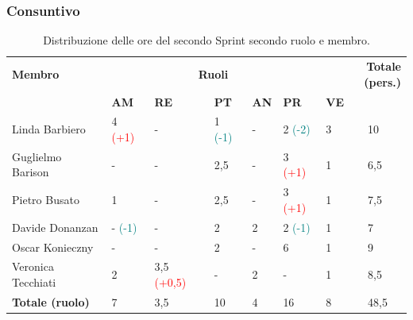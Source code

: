 \subsubsection{Consuntivo}
\begin{table}[ht!]
	\centering
	\begin{tabular}{p{3cm} p{1.4cm} p{1.6cm} p{1.5cm} p{1.5cm} p{1.5cm} p{1.5cm} p{1cm}}
		\toprule
        \textbf{Membro} & \multicolumn{5}{c}{\textbf{Ruoli}} & \multicolumn{2}{r}{\textbf{Totale (pers.)}}\\
		& \textbf{AM} & \textbf{RE} & \textbf{PT} & \textbf{AN} & \textbf{PR} & \textbf{VE}\\
		\midrule
        Linda Barbiero          & 4 \textcolor{red}{(+1)} & - & 1 \textcolor{teal}{(-1)}  & - & 2
        \textcolor{teal}{(-2)} & 3 & 10 \\
        Guglielmo Barison       & - & - & 2,5 & -     & 3 \textcolor{red}{(+1)}  & 1     & 6,5\\
        Pietro Busato           & 1     & -     & 2,5     & -     & 3 \textcolor{red}{(+1)}  & 1     & 7,5 \\
        Davide Donanzan         & - \textcolor{teal}{(-1)}    & -     & 2     & 2     & 2
        \textcolor{teal}{(-1)}     & 1     & 7 \\
        Oscar Konieczny         & -   & -     & 2     & -     & 6     & 1     & 9 \\
        Veronica Tecchiati      & 2   & 3,5 \textcolor{red}{(+0,5)}     & -     & 2     & -     & 1     & 8,5 \\
        \bottomrule
        \textbf{Totale (ruolo)} & 7    & 3,5     & 10     & 4   & 16     & 8   & 48,5 \\
	\end{tabular}
	\caption{Distribuzione delle ore del secondo Sprint secondo ruolo e membro.}
	\label{table:Distribuzione delle ore consuntive del secondo Sprint secondo ruolo e membro}
\end{table}
